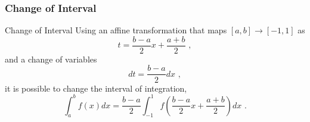 \documentclass[11pt]{beamer}
\begin{document}
\subsubsection{Change of Interval}
\begin{frame}[fragile]{Change of Interval}
Using an affine transformation that maps $[a,b]
\rightarrow [-1,1]$ as 
\begin{equation}
t = \frac{b-a}{2} x + \frac{a+b}{2}\,\,,
\end{equation}
and a change of variables
\begin{equation}
dt = \frac{b-a}{2} dx\,\,,
\end{equation}
it is possible to change the interval of integration, 
\begin{equation}
 \int_{a}^{b} f(x) dx = \frac{b-a}{2} \int_{-1}^1 f\left(\frac{b-a}{2}x + \frac{a+b}{2}\right) dx\,\,.
\end{equation}
\end{frame}
\end{document}
